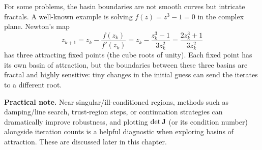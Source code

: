 \begin{exampleBox}
\begin{center}
    \end{center}
\end{exampleBox}

For some problems, the basin boundaries are not smooth curves but intricate fractals. A well-known example is solving \(f(z)=z^3-1=0\) in the complex plane. Newton's map
\begin{equation}
z_{k+1}=z_k-\frac{f(z_k)}{f'(z_k)}=z_k-\frac{z_k^3-1}{3z_k^2}=\frac{2z_k^3+1}{3z_k^2}
\end{equation}
has three attracting fixed points (the cube roots of unity). Each fixed point has its own basin of attraction, but the boundaries between these three basins are fractal and highly sensitive: tiny changes in the initial guess can send the iterates to a different root.


\textbf{Practical note.} Near singular/ill-conditioned regions, methods such as damping/line search, trust-region steps, or continuation strategies can dramatically improve robustness, and plotting \(\det\mathbf{J}\) (or its condition number) alongside iteration counts is a helpful diagnostic when exploring basins of attraction. These are discussed later in this chapter.

